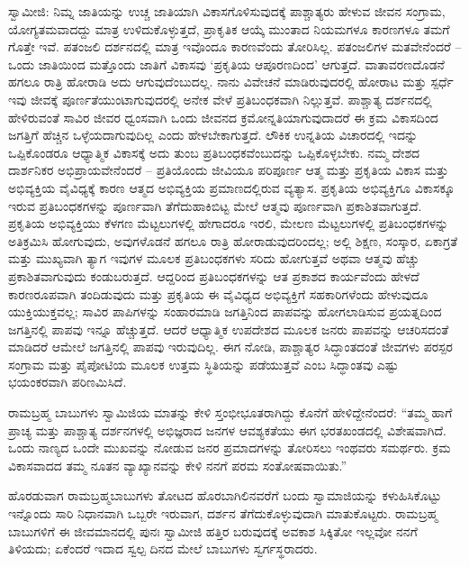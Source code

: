 ಸ್ವಾಮೀಜಿ: ನಿಮ್ನ ಜಾತಿಯನ್ನು ಉಚ್ಚ ಜಾತಿಯಾಗಿ ವಿಕಾಸಗೊಳಿಸುವುದಕ್ಕೆ ಪಾಶ್ಚಾತ್ಯರು ಹೇಳುವ ಜೀವನ ಸಂಗ್ರಾಮ, ಯೋಗ್ಯತಮವಾದದ್ದು ಮಾತ್ರ ಉಳಿದುಕೊಳ್ಳುತ್ತದೆ, ಪ್ರಾಕೃತಿಕ ಆಯ್ಕೆ ಮುಂತಾದ ನಿಯಮಗಳೂ ಕಾರಣಗಳೂ ತಮಗೆ ಗೊತ್ತೇ ಇವೆ. ಪತಂಜಲಿ ದರ್ಶನದಲ್ಲಿ ಮಾತ್ರ ಇವೊಂದೂ ಕಾರಣವೆಂದು ತೋರಿಸಿಲ್ಲ. ಪತಂಜಲಿಗಳ ಮತವೇನೆಂದರೆ – ಒಂದು ಜಾತಿಯಿಂದ ಮತ್ತೊಂದು ಜಾತಿಗೆ ವಿಕಾಸವು ‘ಪ್ರಕೃತಿಯ ಆಪೂರಣದಿಂದ’ ಆಗುತ್ತದೆ. ವಾತಾವರಣದೊಡನೆ ಹಗಲೂ ರಾತ್ರಿ ಹೋರಾಡಿ ಅದು ಆಗುವುದೆಂಬುದಲ್ಲ. ನಾನು ವಿವೇಚನೆ ಮಾಡಿರುವುದರಲ್ಲಿ ಹೋರಾಟ ಮತ್ತು ಸ್ಪರ್ಧೆ ಇವು ಜೀವಕ್ಕೆ ಪೂರ್ಣತೆಯುಂಟಾಗುವುದರಲ್ಲಿ ಅನೇಕ ವೇಳೆ ಪ್ರತಿಬಂಧಕವಾಗಿ ನಿಲ್ಲುತ್ತವೆ. ಪಾಶ್ಚಾತ್ಯ ದರ್ಶನದಲ್ಲಿ ಹೇಳಿರುವಂತೆ ಸಾವಿರ ಜೀವರ ಧ್ವಂಸವಾಗಿ ಒಂದು ಜೀವನದ ಕ್ರಮೋನ್ನತಿಯಾಗುವುದಾದರೆ ಈ ಕ್ರಮ ವಿಕಾಸದಿಂದ ಜಗತ್ತಿಗೆ ಹೆಚ್ಚಿನ ಒಳ್ಳೆಯದಾಗುವುದಿಲ್ಲ ಎಂದು ಹೇಳಬೇಕಾಗುತ್ತದೆ. ಲೌಕಿಕ ಉನ್ನತಿಯ ವಿಚಾರದಲ್ಲಿ ಇದನ್ನು ಒಪ್ಪಿಕೊಂಡರೂ ಆಧ್ಯಾತ್ಮಿಕ ವಿಕಾಸಕ್ಕೆ ಅದು ತುಂಬ ಪ್ರತಿಬಂಧಕವೆಂಬುದನ್ನು ಒಪ್ಪಿಕೊಳ್ಳಬೇಕು. ನಮ್ಮ ದೇಶದ ದಾರ್ಶನಿಕರ ಅಭಿಪ್ರಾಯವೇನೆಂದರೆ – ಪ್ರತಿಯೊಂದು ಜೀವಿಯೂ ಪರಿಪೂರ್ಣ ಆತ್ಮ ಮತ್ತು ಪ್ರಕೃತಿಯ ವಿಕಾಸ ಮತ್ತು ಅಭಿವ್ಯಕ್ತಿಯ ವೈವಿಧ್ಯಕ್ಕೆ ಕಾರಣ ಆತ್ಮದ ಅಭಿವ್ಯಕ್ತಿಯ ಪ್ರಮಾಣದಲ್ಲಿರುವ ವ್ಯತ್ಯಾಸ. ಪ್ರಕೃತಿಯ ಅಭಿವ್ಯಕ್ತಿಗೂ ವಿಕಾಸಕ್ಕೂ ಇರುವ ಪ್ರತಿಬಂಧಕಗಳನ್ನು ಪೂರ್ಣವಾಗಿ ತೆಗೆದುಹಾಕಿಬಿಟ್ಟ ಮೇಲೆ ಆತ್ಮವು ಪೂರ್ಣವಾಗಿ ಪ್ರಕಾಶಿತವಾಗುತ್ತದೆ. ಪ್ರಕೃತಿಯ ಅಭಿವ್ಯಕ್ತಿಯು ಕೆಳಗಣ ಮೆಟ್ಟಲುಗಳಲ್ಲಿ ಹೇಗಾದರೂ ಇರಲಿ, ಮೇಲಣ ಮೆಟ್ಟಲುಗಳಲ್ಲಿ ಪ್ರತಿಬಂಧಕಗಳನ್ನು ಅತಿಕ್ರಮಿಸಿ ಹೋಗುವುದು, ಅವುಗಳೊಡನೆ ಹಗಲೂ ರಾತ್ರಿ ಹೋರಾಡುವುದರಿಂದಲ್ಲ; ಅಲ್ಲಿ ಶಿಕ್ಷಣ, ಸಂಸ್ಕಾರ, ಏಕಾಗ್ರತೆ ಮತ್ತು ಮುಖ್ಯವಾಗಿ ತ್ಯಾಗ ಇವುಗಳ ಮೂಲಕ ಪ್ರತಿಬಂಧಕಗಳು ಸರಿದು ಹೋಗುತ್ತವೆ ಅಥವಾ ಆತ್ಮವು ಹೆಚ್ಚು ಪ್ರಕಾಶಿತವಾಗುವುದು ಕಂಡುಬರುತ್ತದೆ. ಆದ್ದರಿಂದ ಪ್ರತಿಬಂಧಕಗಳನ್ನು ಆತ ಪ್ರಕಾಶದ ಕಾರ್ಯವೆಂದು ಹೇಳದೆ ಕಾರಣರೂಪವಾಗಿ ತಂದಿಡುವುದು ಮತ್ತು ಪ್ರಕೃತಿಯ ಈ ವೈವಿಧ್ಯದ ಅಭಿವ್ಯಕ್ತಿಗೆ ಸಹಕಾರಿಗಳೆಂದು ಹೇಳುವುದೂ ಯುಕ್ತಿಯುಕ್ತವಲ್ಲ; ಸಾವಿರ ಪಾಪಿಗಳನ್ನು ಸಂಹಾರಮಾಡಿ ಜಗತ್ತಿನಿಂದ ಪಾಪವನ್ನು ಹೋಗಲಾಡಿಸುವ ಪ್ರಯತ್ನದಿಂದ ಜಗತ್ತಿನಲ್ಲಿ ಪಾಪವು ಇನ್ನೂ ಹೆಚ್ಚುತ್ತದೆ. ಆದರೆ ಆಧ್ಯಾತ್ಮಿಕ ಉಪದೇಶದ ಮೂಲಕ ಜನರು ಪಾಪವನ್ನು ಆಚರಿಸದಂತೆ ಮಾಡಿದರೆ ಆಮೇಲೆ ಜಗತ್ತಿನಲ್ಲಿ ಪಾಪವು ಇರುವುದಿಲ್ಲ. ಈಗ ನೋಡಿ, ಪಾಶ್ಚಾತ್ಯರ ಸಿದ್ಧಾಂತದಂತೆ ಜೀವಗಳು ಪರಸ್ಪರ ಸಂಗ್ರಾಮ ಮತ್ತು ಪೈಪೋಟಿಯ ಮೂಲಕ ಉತ್ತಮ ಸ್ಥಿತಿಯನ್ನು ಪಡೆಯುತ್ತವೆ ಎಂಬ ಸಿದ್ಧಾಂತವು ಎಷ್ಟು ಭಯಂಕರವಾಗಿ ಪರಿಣಮಿಸಿದೆ.

ರಾಮಬ್ರಹ್ಮ ಬಾಬುಗಳು ಸ್ವಾಮಿಜಿಯ ಮಾತನ್ನು ಕೇಳಿ ಸ್ತಂಭೀಭೂತರಾಗಿದ್ದು ಕೊನೆಗೆ ಹೇಳಿದ್ದೇನೆಂದರೆ: “ತಮ್ಮ ಹಾಗೆ ಪ್ರಾಚ್ಯ ಮತ್ತು ಪಾಶ್ಚಾತ್ಯ ದರ್ಶನಗಳಲ್ಲಿ ಅಭಿಜ್ಞರಾದ ಜನಗಳ ಆವಶ್ಯಕತೆಯು ಈಗ ಭರತಖಂಡದಲ್ಲಿ ವಿಶೇಷವಾಗಿದೆ. ಒಂದು ನಾಣ್ಯದ ಒಂದೇ ಮುಖವನ್ನು ನೋಡುವ ಜನರ ಪ್ರಮಾದಗಳನ್ನು ತೋರಿಸಲು ಇಂಥವರು ಸಮರ್ಥರು. ಕ್ರಮ ವಿಕಾಸವಾದದ ತಮ್ಮ ನೂತನ ವ್ಯಾಖ್ಯಾನವನ್ನು ಕೇಳಿ ನನಗೆ ಪರಮ ಸಂತೋಷವಾಯಿತು.”

ಹೊರಡುವಾಗ ರಾಮಬ್ರಹ್ಮಬಾಬುಗಳು ತೋಟದ ಹೊರಬಾಗಿಲಿನವರೆಗೆ ಬಂದು ಸ್ವಾಮಾಜಿಯನ್ನು ಕಳುಹಿಸಿಕೊಟ್ಟು ಇನ್ನೊಂದು ಸಾರಿ ನಿಧಾನವಾಗಿ ಒಬ್ಬರೇ ಇರುವಾಗ, ದರ್ಶನ ತೆಗೆದುಕೊಳ್ಳುವುದಾಗಿ ಮಾತುಕೊಟ್ಟರು. ರಾಮಬ್ರಹ್ಮ ಬಾಬುಗಳಿಗೆ ಈ ಜೀವಮಾನದಲ್ಲಿ ಪುನಃ ಸ್ವಾಮೀಜಿ ಹತ್ತಿರ ಬರುವುದಕ್ಕೆ ಅವಕಾಶ ಸಿಕ್ಕಿತೋ ಇಲ್ಲವೋ ನನಗೆ ತಿಳಿಯದು; ಏಕೆಂದರೆ ಇದಾದ ಸ್ವಲ್ಪ ದಿನದ ಮೇಲೆ ಬಾಬುಗಳು ಸ್ವರ್ಗಸ್ಥರಾದರು.


